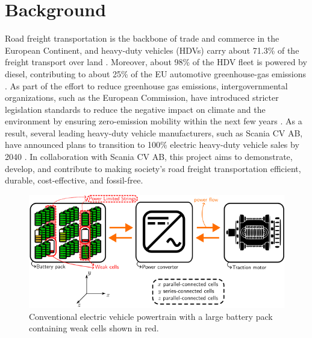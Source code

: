 \documentclass{article}
\begin{document}
\section{Background} 
Road freight transportation is the backbone of trade and commerce in the European Continent, and heavy-duty vehicles (HDVs) carry about 71.3\% of the freight transport over land \cite{aceatrucks}. Moreover, about 98\% of the HDV fleet is powered by diesel, contributing to about 25\% of the EU automotive greenhouse-gas emissions \cite{ccesregulation}. As part of the effort to reduce greenhouse gas emissions, intergovernmental organizations, such as the European Commission, have introduced stricter legislation standards to reduce the negative impact on climate and the environment by ensuring zero-emission mobility within the next few years \cite{european2011communication}. As a result, several leading heavy-duty vehicle manufacturers, such as Scania CV AB, have announced plans to transition to 100\% electric heavy-duty vehicle sales by 2040 \cite{ragon2021co2}. In collaboration with Scania CV AB, this project aims to demonstrate, develop, and contribute to making society's road freight transportation efficient, durable, cost-effective, and fossil-free.
\begin{figure}[!t]
    \centering
    \includegraphics[width=\textwidth]{Figures/conventional_powertrain.png}
    \caption{Conventional electric vehicle powertrain with a large battery pack containing weak cells shown in red.}
    \label{fig:convEVpoertrain}
\end{figure}
\end{document}
